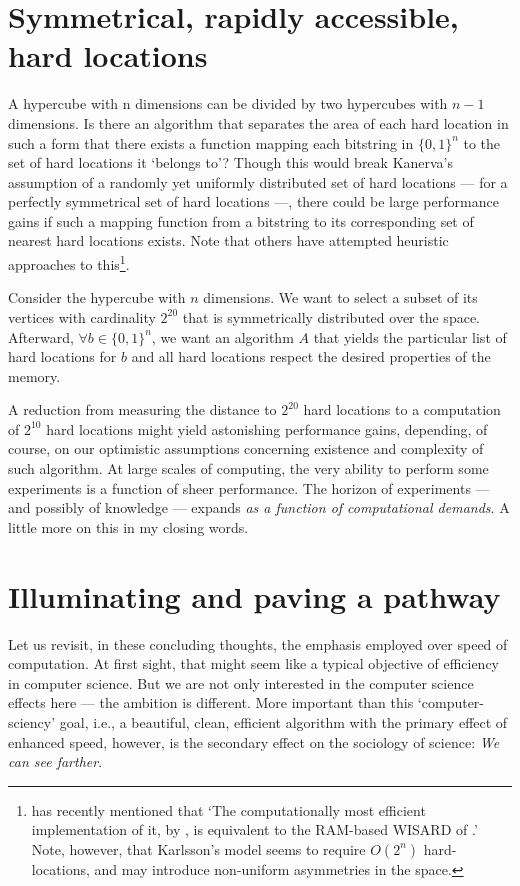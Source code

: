 \section{Symmetrical, rapidly accessible, hard locations}

A hypercube with n dimensions can be divided by two hypercubes with $n-1$ dimensions. Is there an algorithm that separates the area of each hard location in such a form that there exists a function mapping each bitstring in $\{0,1\}^n$ to the set of hard locations it `belongs to'?  Though this would break Kanerva's assumption of a randomly yet uniformly distributed set of hard locations --- for a perfectly symmetrical set of hard locations ---, there could be large performance gains if such a mapping function from a bitstring to its corresponding set of nearest hard locations exists. Note that others have attempted heuristic approaches to this\footnote{\citet{Kanerva2009} has recently mentioned that `The computationally most efficient implementation of it, by \citet{Karlsson95afast}, is equivalent to the RAM-based WISARD of  \citet{aleksander1982computer}.' Note, however, that Karlsson's model seems to require $O(2^n)$ hard-locations, and may introduce non-uniform asymmetries in the space.}.

Consider the hypercube with $n$ dimensions.  We want to select a subset of its vertices with cardinality $2^{20}$ that is symmetrically distributed over the space. Afterward, $\forall b \in \{ 0,1\} ^n$, we want an algorithm $A$ that yields the particular list of hard locations for $b$ and all hard locations respect the desired properties of the memory.

A reduction from measuring the distance to $2^{20}$ hard locations to a computation of $2^{10}$ hard locations might yield astonishing performance gains, depending, of course, on our optimistic assumptions concerning existence and complexity of such algorithm.  At large scales of computing, the very ability to perform some experiments is a function of sheer performance. The horizon of experiments --- and possibly of knowledge --- expands \emph{as a function of computational demands}. A little more on this in my closing words.



\section{Illuminating and paving a pathway}

Let us revisit, in these concluding thoughts, the emphasis employed over speed of computation.  At first sight, that might seem like a typical objective of efficiency in computer science. But we are not only interested in the computer science effects here --- the ambition is different. More important than this `computer-sciency' goal, i.e., a beautiful, clean, efficient algorithm with the primary effect of enhanced speed, however, is the secondary effect on the sociology of science:  \emph{We can see farther}.


